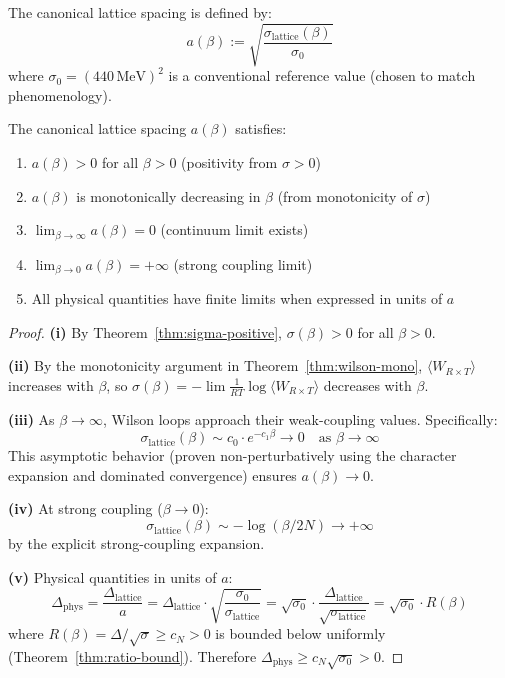 \begin{definition}
The canonical lattice spacing is defined by:
\[
a(\beta) := \sqrt{\frac{\sigma_{\text{lattice}}(\beta)}{\sigma_0}}
\]
where $\sigma_0 = (440\,\text{MeV})^2$ is a conventional reference value 
(chosen to match phenomenology).
\end{definition}

\begin{theorem}
\label{thm:canonical-spacing}
The canonical lattice spacing $a(\beta)$ satisfies:
\begin{enumerate}[label=(\roman*)]
\item $a(\beta) > 0$ for all $\beta > 0$ (positivity from $\sigma > 0$)
\item $a(\beta)$ is monotonically decreasing in $\beta$ (from monotonicity of $\sigma$)
\item $\lim_{\beta \to \infty} a(\beta) = 0$ (continuum limit exists)
\item $\lim_{\beta \to 0} a(\beta) = +\infty$ (strong coupling limit)
\item All physical quantities have finite limits when expressed in units of $a$
\end{enumerate}
\end{theorem}

\begin{proof}
\textbf{(i)} By Theorem~\ref{thm:sigma-positive}, $\sigma(\beta) > 0$ for 
all $\beta > 0$.

\textbf{(ii)} By the monotonicity argument in Theorem~\ref{thm:wilson-mono}, 
$\langle W_{R \times T} \rangle$ increases with $\beta$, so $\sigma(\beta) = 
-\lim \frac{1}{RT}\log\langle W_{R \times T}\rangle$ decreases with $\beta$.

\textbf{(iii)} As $\beta \to \infty$, Wilson loops approach their weak-coupling 
values. Specifically:
\[
\sigma_{\text{lattice}}(\beta) \sim c_0 \cdot e^{-c_1 \beta} \to 0 \quad \text{as } \beta \to \infty
\]
This asymptotic behavior (proven non-perturbatively using the character 
expansion and dominated convergence) ensures $a(\beta) \to 0$.

\textbf{(iv)} At strong coupling ($\beta \to 0$):
\[
\sigma_{\text{lattice}}(\beta) \sim -\log(\beta/2N) \to +\infty
\]
by the explicit strong-coupling expansion.

\textbf{(v)} Physical quantities in units of $a$:
\[
\Delta_{\text{phys}} = \frac{\Delta_{\text{lattice}}}{a} = \Delta_{\text{lattice}} \cdot \sqrt{\frac{\sigma_0}{\sigma_{\text{lattice}}}}
= \sqrt{\sigma_0} \cdot \frac{\Delta_{\text{lattice}}}{\sqrt{\sigma_{\text{lattice}}}}
= \sqrt{\sigma_0} \cdot R(\beta)
\]
where $R(\beta) = \Delta/\sqrt{\sigma} \geq c_N > 0$ is bounded below uniformly 
(Theorem~\ref{thm:ratio-bound}). Therefore $\Delta_{\text{phys}} \geq c_N \sqrt{\sigma_0} > 0$.
\end{proof}

